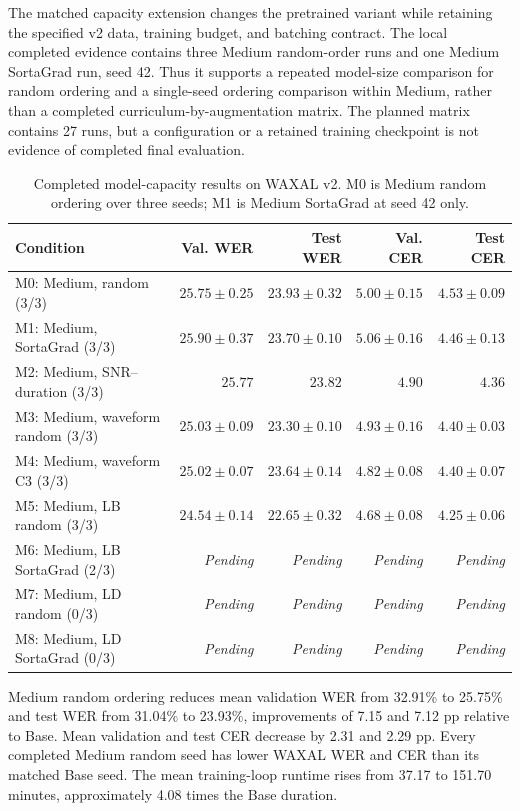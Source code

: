 \documentclass[12pt,a4paper]{report}
\begin{document}
The matched capacity extension changes the pretrained variant while retaining the specified v2 data, training budget, and batching contract. The local completed evidence contains three Medium random-order runs and one Medium SortaGrad run, seed 42. Thus it supports a repeated model-size comparison for random ordering and a single-seed ordering comparison within Medium, rather than a completed curriculum-by-augmentation matrix. The planned matrix contains 27 runs, but a configuration or a retained training checkpoint is not evidence of completed final evaluation.

\begin{table}[htbp]\centering\scriptsize
\caption{Completed model-capacity results on WAXAL v2. M0 is Medium random ordering over three seeds; M1 is Medium SortaGrad at seed 42 only.}\label{tab:results-medium}
\setlength{\tabcolsep}{4pt}
\begin{tabular}{lrrrr}\toprule
Condition & Val. WER & Test WER & Val. CER & Test CER\\\midrule
M0: Medium, random (3/3) & $25.75 \pm 0.25$ & $23.93 \pm 0.32$ & $5.00 \pm 0.15$ & $4.53 \pm 0.09$ \\
M1: Medium, SortaGrad (3/3) & $25.90 \pm 0.37$ & $23.70 \pm 0.10$ & $5.06 \pm 0.16$ & $4.46 \pm 0.13$ \\
M2: Medium, SNR--duration (3/3) & $25.77$ & $23.82$ & $4.90$ & $4.36$ \\
M3: Medium, waveform random (3/3) & $25.03 \pm 0.09$ & $23.30 \pm 0.10$ & $4.93 \pm 0.16$ & $4.40 \pm 0.03$ \\
M4: Medium, waveform C3 (3/3) & $25.02 \pm 0.07$ & $23.64 \pm 0.14$ & $4.82 \pm 0.08$ & $4.40 \pm 0.07$ \\
M5: Medium, LB random (3/3) & $24.54 \pm 0.14$ & $22.65 \pm 0.32$ & $4.68 \pm 0.08$ & $4.25 \pm 0.06$ \\
M6: Medium, LB SortaGrad (2/3) & \textit{Pending} & \textit{Pending} & \textit{Pending} & \textit{Pending} \\
M7: Medium, LD random (0/3) & \textit{Pending} & \textit{Pending} & \textit{Pending} & \textit{Pending} \\
M8: Medium, LD SortaGrad (0/3) & \textit{Pending} & \textit{Pending} & \textit{Pending} & \textit{Pending} \\
\bottomrule\end{tabular}\end{table}

Medium random ordering reduces mean validation WER from 32.91\% to 25.75\% and test WER from 31.04\% to 23.93\%, improvements of 7.15 and 7.12 pp relative to Base. Mean validation and test CER decrease by 2.31 and 2.29 pp. Every completed Medium random seed has lower WAXAL WER and CER than its matched Base seed. The mean training-loop runtime rises from 37.17 to 151.70 minutes, approximately 4.08 times the Base duration.
\end{document}

